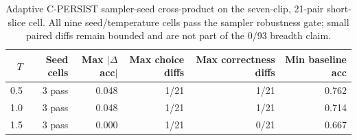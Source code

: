 \begin{table}[H]
\centering
\caption{Adaptive C-PERSIST sampler-seed cross-product on the seven-clip, 21-pair short-slice cell. All nine seed/temperature cells pass the sampler robustness gate; small paired diffs remain bounded and are not part of the 0/93 breadth claim.}
\label{tab:c-persist-sampler-seed-sweep}
\small
\renewcommand{\arraystretch}{\PaperTableStretch}
\begin{tabular}{@{}r r r r r r@{}}
\toprule
\(T\) & Seed cells & Max \(|\Delta\)acc\(|\) & Max choice diffs & Max correctness diffs & Min baseline acc \\
\midrule
0.5 & 3 pass & 0.048 & 1/21 & 1/21 & 0.762 \\
1.0 & 3 pass & 0.048 & 1/21 & 1/21 & 0.714 \\
1.5 & 3 pass & 0.000 & 1/21 & 0/21 & 0.667 \\
\bottomrule
\end{tabular}
\end{table}
